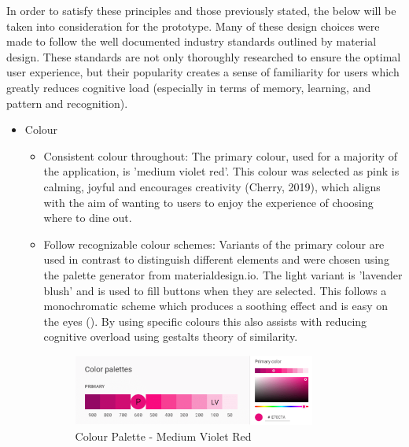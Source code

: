 \documentclass[a4 paper, 12pt]{article}
\begin{document}
    In order to satisfy these principles and those previously stated, the below will be taken into consideration for the prototype. Many of these design choices were made to follow the well documented industry standards outlined by material design. These standards are not only thoroughly researched to ensure the optimal user experience, but their popularity creates a sense of familiarity for users which greatly reduces cognitive load (especially in terms of memory, learning, and pattern and recognition). 
        \begin{itemize}
            \item Colour
                \begin{itemize}
                    \item Consistent colour throughout: The primary colour, used for a majority of the application, is 'medium violet red'. This colour was selected as pink is calming, joyful and encourages creativity (Cherry, 2019), which aligns with the aim of wanting to users to enjoy the experience of choosing where to dine out.
                    \item Follow recognizable colour schemes: Variants of the primary colour are used in contrast to distinguish different elements and were chosen using the palette generator from materialdesign.io. The light variant is 'lavender blush' and is used to fill buttons when they are selected. This follows a monochromatic scheme which produces a soothing effect and is easy on the eyes (). By using specific colours this also assists with reducing cognitive overload using gestalts theory of similarity.   
                    \begin{figure} [H]
                        \centering
                        \includegraphics[width=0.8\textwidth, frame]
                            {./Med_Fidelity/Med_Report/images/colour_med.PNG}
                        \caption{Colour Palette - Medium Violet Red}
                    \end{figure}
                \end{itemize}


\end{itemize}
\end{document}
